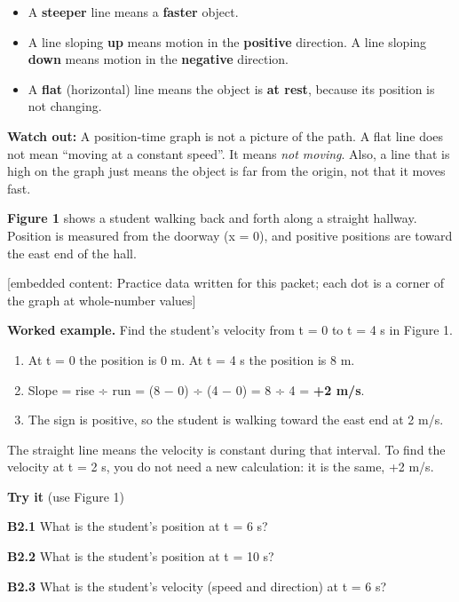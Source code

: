\documentclass[
]{article}
\providecommand{\tightlist}{%
  \setlength{\itemsep}{0pt}\setlength{\parskip}{0pt}}
\begin{document}
\begin{itemize}
\tightlist
\item
  A \textbf{steeper} line means a \textbf{faster} object.
\item
  A line sloping \textbf{up} means motion in the \textbf{positive}
  direction. A line sloping \textbf{down} means motion in the
  \textbf{negative} direction.
\item
  A \textbf{flat} (horizontal) line means the object is \textbf{at
  rest}, because its position is not changing.
\end{itemize}

\textbf{Watch out:} A position-time graph is not a picture of the path.
A flat line does not mean ``moving at a constant speed''. It means
\emph{not moving}. Also, a line that is high on the graph just means the
object is far from the origin, not that it moves fast.

\textbf{Figure 1} shows a student walking back and forth along a
straight hallway. Position is measured from the doorway (x = 0), and
positive positions are toward the east end of the hall.

{[}embedded content: Practice data written for this packet; each dot is
a corner of the graph at whole-number values{]}

\textbf{Worked example.} Find the student's velocity from t = 0 to t = 4
s in Figure 1.

\begin{enumerate}
\def\labelenumi{\arabic{enumi}.}
\tightlist
\item
  At t = 0 the position is 0 m. At t = 4 s the position is 8 m.
\item
  Slope = rise ÷ run = (8 − 0) ÷ (4 − 0) = 8 ÷ 4 = \textbf{+2 m/s}.
\item
  The sign is positive, so the student is walking toward the east end at
  2 m/s.
\end{enumerate}

The straight line means the velocity is constant during that interval.
To find the velocity at t = 2 s, you do not need a new calculation: it
is the same, +2 m/s.

\textbf{Try it} (use Figure 1)

\textbf{B2.1} What is the student's position at t = 6 s?

\textbf{B2.2} What is the student's position at t = 10 s?

\textbf{B2.3} What is the student's velocity (speed and direction) at t
= 6 s?
\end{document}
